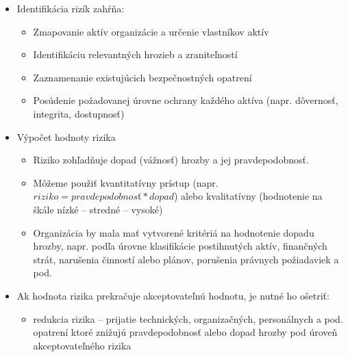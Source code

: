 \documentclass[12pt,a4paper]{article}
\begin{document}
{\begin{itemize}
          \item Identifikácia rizík zahŕňa:
          \begin{itemize}
            \item Zmapovanie aktív organizácie a určenie vlastníkov aktív
            \item Identifikáciu relevantných hrozieb a zraniteľností
            \item Zaznamenanie existujúcich bezpečnostných opatrení
            \item Posúdenie požadovanej úrovne ochrany každého aktíva
                  (napr. dôvernosť, integrita, dostupnosť)
          \end{itemize}
        \item Výpočet hodnoty rizika
        \begin{itemize}
            \item Riziko zohľadňuje dopad (vážnosť) hrozby a jej pravdepodobnosť.
            \item Môžeme použiť kvantitatívny prístup (napr. $riziko=pravdepodobnosť*dopad$) alebo kvalitatívny (hodnotenie na škále nízké -- stredné -- vysoké)
            \item Organizácia by mala mať vytvorené kritériá na hodnotenie dopadu hrozby, napr. podľa úrovne klasifikácie postihnutých aktív, finančných strát, narušenia činností alebo plánov, porušenia právnych požiadaviek a pod.
        \end{itemize}
        \item Ak hodnota rizika prekračuje akceptovateľnú hodnotu, je nutné ho ošetriť:
        \begin{itemize}
            \item redukcia rizika -- prijatie technických, organizačných, personálnych a pod. opatrení ktoré znižujú pravdepodobnosť alebo dopad hrozby pod úroveň akceptovateľného rizika

\end{itemize}
\end{itemize}}
\end{document}
